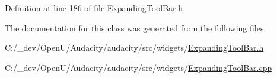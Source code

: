 Definition at line 186 of file Expanding\+Tool\+Bar.\+h.



The documentation for this class was generated from the following files\+:\begin{DoxyCompactItemize}
\item 
C\+:/\+\_\+dev/\+Open\+U/\+Audacity/audacity/src/widgets/\hyperlink{_expanding_tool_bar_8h}{Expanding\+Tool\+Bar.\+h}\item 
C\+:/\+\_\+dev/\+Open\+U/\+Audacity/audacity/src/widgets/\hyperlink{_expanding_tool_bar_8cpp}{Expanding\+Tool\+Bar.\+cpp}\end{DoxyCompactItemize}
